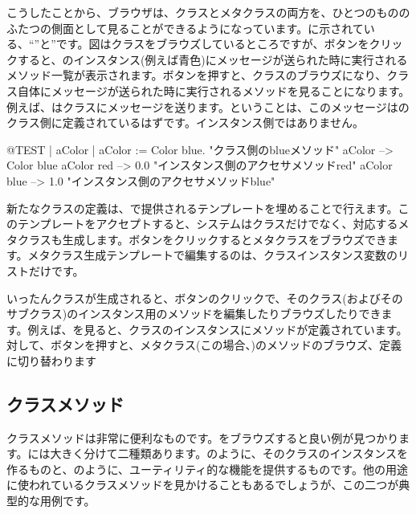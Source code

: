\documentclass[a4paper,10pt,twoside]{book}
\begin{document}
こうしたことから、ブラウザは、クラスとメタクラスの両方を、ひとつのもののふたつの側面として見ることができるようになっています。に示されている、``''と''です。図はクラスをブラウズしているところですが、ボタンをクリックすると、のインスタンス(例えば青色)にメッセージが送られた時に実行されるメソッド一覧が表示されます。ボタンを押すと、クラスのブラウズになり、クラス自体にメッセージが送られた時に実行されるメソッドを見ることになります。例えば、はクラスにメッセージを送ります。ということは、このメッセージはのクラス側に定義されているはずです。インスタンス側ではありません。

\begin{code}{@TEST | aColor |}
aColor := Color blue.               "クラス側のblueメソッド"
aColor        --> Color blue
aColor red  --> 0.0         "インスタンス側のアクセサメソッドred"
aColor blue --> 1.0        "インスタンス側のアクセサメソッドblue"
\end{code}

新たなクラスの定義は、で提供されるテンプレートを埋めることで行えます。このテンプレートをアクセプトすると、システムはクラスだけでなく、対応するメタクラスも生成します。ボタンをクリックするとメタクラスをブラウズできます。メタクラス生成テンプレートで編集するのは、クラスインスタンス変数のリストだけです。

いったんクラスが生成されると、ボタンのクリックで、そのクラス(およびそのサブクラス)のインスタンス用のメソッドを編集したりブラウズしたりできます。例えば、を見ると、クラスのインスタンスにメソッドが定義されています。対して、ボタンを押すと、メタクラス(この場合、)のメソッドのブラウズ、定義に切り替わります

\subsection{クラスメソッド} 

クラスメソッドは非常に便利なものです。をブラウズすると良い例が見つかります。には大きく分けて二種類あります。のように、そのクラスのインスタンスを作るものと、のように、ユーティリティ的な機能を提供するものです。他の用途に使われているクラスメソッドを見かけることもあるでしょうが、この二つが典型的な用例です。
\end{document}
